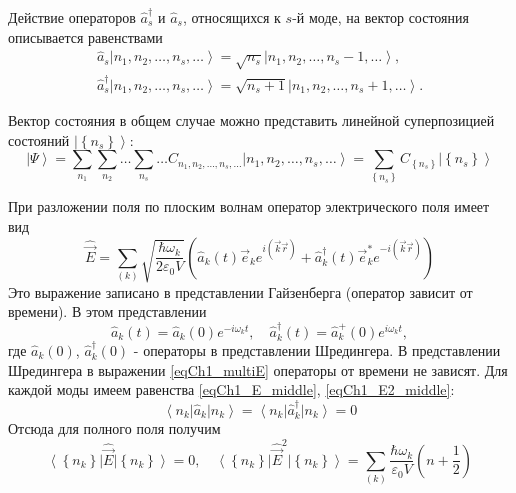 Действие операторов $\hat{a}_s^{\dag}$ и $\hat{a}_s$,  относящихся к $s$-й
моде, на вектор состояния описывается равенствами 
\begin{eqnarray}
\hat{a}_s \left| n_1, n_2, \dots, n_s, \dots\right> = \sqrt{n_s} \left|
n_1, n_2, \dots, n_s - 1, \dots\right>,
\nonumber \\
\hat{a}_s^{\dag} \left| n_1, n_2, \dots, n_s, \dots\right> = \sqrt{n_s + 1} \left|
n_1, n_2, \dots, n_s + 1, \dots\right>.
\end{eqnarray} 

Вектор состояния в общем случае можно представить линейной
суперпозицией состояний  $\left| \left\{n_s\right\}\right>$: 
\begin{equation}
\left|\Psi\right> = \sum_{n_1}\sum_{n_2}\dots\sum_{n_s}\dots
C_{n_1, n_2, \dots, n_s, \dots} \left| n_1, n_2, \dots, n_s,
\dots\right>= 
\sum_{\left\{n_s\right\}} C_{\left\{n_s\right\}} \left| \left\{n_s\right\}\right>
\end{equation}

При разложении поля по плоским волнам оператор электрического поля 
имеет вид
\begin{equation}
\hat{\vec{E}} = \sum_{(k)} \sqrt{\frac{\hbar \omega_k}{2 \varepsilon_0
V}} \left( 
\hat{a}_k\left(t\right) \vec{e}_k e^{i \left(\vec{k}\vec{r} \right)} +
\hat{a}_k^{\dag}\left(t\right) \vec{e}_k^{*} e^{-i \left(\vec{k}\vec{r} \right)}
\right)
\label{eqCh1_multiE}
\end{equation}
Это выражение записано в представлении Гайзенберга (оператор зависит
от времени). В этом представлении 
\[
\hat{a}_k\left(t\right) = \hat{a}_k\left(0\right) e^{-i \omega_k t},
\quad
\hat{a}_k^{\dag}\left(t\right) = \hat{a}_k^{+}\left(0\right) e^{i \omega_k t},
\]
где $\hat{a}_k\left(0\right)$, $\hat{a}_k^{\dag}\left(0\right)$ -
операторы в представлении Шредингера. В представлении Шредингера в
выражении \eqref{eqCh1_multiE} операторы от времени не зависят.
Для каждой моды имеем 
равенства \eqref{eqCh1_E_middle}, \eqref{eqCh1_E2_middle}: 
\[
\left<n_k\right|\hat{a}_k\left|n_k\right> = 
\left<n_k\right|\hat{a}^{\dag}_k\left|n_k\right> = 0
\]
Отсюда для полного поля получим
\begin{equation}
\left<\left\{n_k\right\}\right|\hat{\vec{E}}\left|\left\{n_k\right\}\right>
= 0, \quad
\left<\left\{n_k\right\}\right|\hat{\vec{E}}^2\left|\left\{n_k\right\}\right>
= \sum_{(k)}\frac{\hbar \omega_k}{\varepsilon_0 V}
\left(n + \frac{1}{2} \right)
\end{equation}

